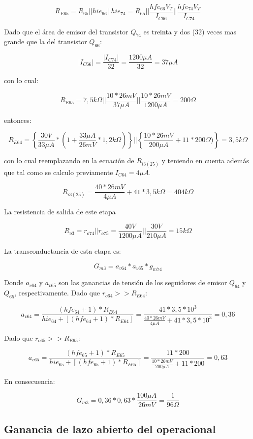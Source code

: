 \documentclass[12pt,a4paper,final,headinclude,footinclude,BCOR5mm]{scrartcl}
\begin{document}
$$R_{E65} = R_{65} || hie_{66} || hie_{74} = R_{65} || \frac{hfe_{66} V_{T}}{I_{C66}} || \frac{hfe_{74} V_{T}}{I_{C74}}$$

Dado que el área de emisor del transistor $Q_{74}$ es treinta y dos (32) veces mas grande que la del transistor $Q_{66}$:

$$|I_{C66}| = \frac{|I_{C74}|}{32} = \frac{1200 \mu A}{32} = 37 \mu A$$

con lo cual:

$$R_{E65} = 7,5 k\Omega || \frac{10*26 mV}{37 \mu A} || \frac{10*26 mV}{1200 \mu A} = 200 \Omega$$

entonces:

$$R_{E64} = \left \{ \frac{30 V}{33 \mu A} * (1 + \frac{33 \mu A}{26 mV} * 1,2 k\Omega)\right \} || \left \{ \frac{10*26 mV}{200 \mu A} + 11*200 \Omega)\right \} = 3,5 k\Omega$$

con lo cual reemplazando en la ecuación de $R_{i3(25)}$ y teniendo en cuenta además que tal como se calculo previamente $I_{C64} = 4 \mu A$.

$$R_{i3(25)} = \frac{40*26 mV}{4 \mu A} + 41*3,5 k\Omega = 404 k\Omega$$

La resistencia de salida de este etapa

$$R_{o3} = r_{o74} || r_{o75} = \frac{40 V}{1200 \mu A} || \frac{30 V}{210 \mu A} = 15 k\Omega$$

La transconductancia de esta etapa es:

$$G_{m3} = a_{v64}*a_{v65}*g_{m74}$$

Donde $a_{v64}$ y $a_{v65}$ son las ganancias de tensión de los seguidores de emisor $Q_{64}$ y $Q_{65}$, respectivamente. Dado que $r_{o64} >> R_{E64}$:

$$a_{v64} = \frac{(hfe_{64} + 1)*R_{E64}}{hie_{64} + [(hfe_{64} + 1)*R_{E64}]} = \frac{41*3,5*10^{3}}{\frac{40*26 mV}{4 \mu A} + 41*3,5*10^{3}} = 0,36$$

Dado que $r_{o65} >> R_{E65}$:

$$a_{v65} = \frac{(hfe_{65} + 1)*R_{E65}}{hie_{65} + [(hfe_{65} + 1)*R_{E65}]} = \frac{11*200}{\frac{10*26 mV}{200 \mu A} + 11*200} = 0,63$$

En consecuencia:

$$G_{m3} = 0,36 * 0,63 * \frac{100 \mu A}{26 mV} = \frac{1}{96 \Omega}$$

\subsection{Ganancia de lazo abierto del operacional}
\end{document}
